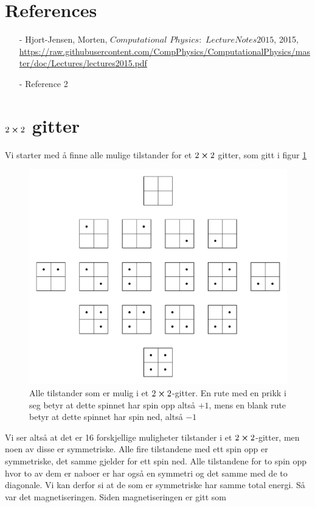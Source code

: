 \documentclass[reprint,english,notitlepage]{revtex4-2}  %
\begin{document}
\section*{References}  %
\begin{itemize}
\item[-]Hjort-Jensen, Morten, $Computational$ $Physics:$ $Lecture Notes 2015$, 2015, \url{https://raw.githubusercontent.com/CompPhysics/ComputationalPhysics/master/doc/Lectures/lectures2015.pdf}
\item[-]Reference 2
\end{itemize}
\newpage

\appendix
\section{$2\cross 2$ gitter}
Vi starter med å finne alle mulige tilstander for et $2\cross 2$ gitter, som gitt i figur \ref{2x2}
\begin{figure}[H]
	\label{2x2}
	\includegraphics[scale=0.5]{Latice.pdf}
	\caption{Alle tilstander som er mulig i et $2\cross2$-gitter. En rute med en prikk i seg betyr at dette spinnet har spin opp altså $+1$, mens en blank rute betyr at dette spinnet har spin ned, altså $-1$}
\end{figure}
Vi ser altså at det er 16 forskjellige muligheter tilstander i et $2\cross2$-gitter, men noen av disse er symmetriske. Alle fire tilstandene med ett spin opp er symmetriske, det samme gjelder for ett spin ned. Alle tilstandene for to spin opp hvor to av dem er naboer er har også en symmetri og det samme med de to diagonale. Vi kan derfor si at de som er symmetriske har samme total energi.
\newline Så var det magnetiseringen. Siden magnetiseringen er gitt som
\end{document}
